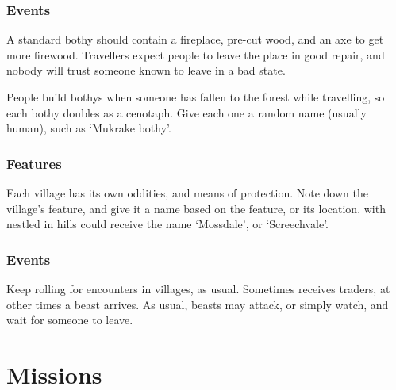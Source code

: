 \begin{multicols}{2}

\subsubsection{ Events}
A standard \gls{bothy} should contain a fireplace, pre-cut wood, and an axe to get more firewood.
Travellers expect people to leave the place in good repair, and nobody will trust someone known to leave  in a bad state.

People build \glspl{bothy} when someone has fallen to the forest while travelling, so each \gls{bothy} doubles as a cenotaph.
Give each one a random name (usually human), such as `Mukrake \Gls{bothy}'.

\bothyEvents

\subsubsection{ Features}
\label{villageFeatures}

Each \gls{village} has its own oddities, and means of protection.
Note down the \gls{village}'s feature, and give it a name based on the feature, or its location.
 with  nestled in hills could receive the name `Mossdale', or `Screechvale'.

\encVillageFeatures

\subsubsection{ Events}

Keep rolling for encounters in \glspl{village}, as usual.
Sometimes  receives traders, at other times a beast arrives.
As usual, beasts may attack, or simply watch, and wait for someone to leave.

\encVillageEvent

\end{multicols}

\section{Missions}

